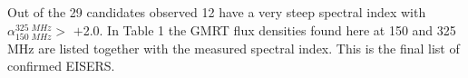 \documentclass[proof]{WileyASNA-v1}
\begin{document}

Out of the 29 candidates observed 12 have a very steep spectral index with $\alpha^{325\;MHz}_{150\;MHz} >$ $+$2.0. In Table 1 the GMRT flux densities found here at 150 and 325 MHz are listed together with the measured spectral index. This is the final list of confirmed EISERS. %
\end{document}

